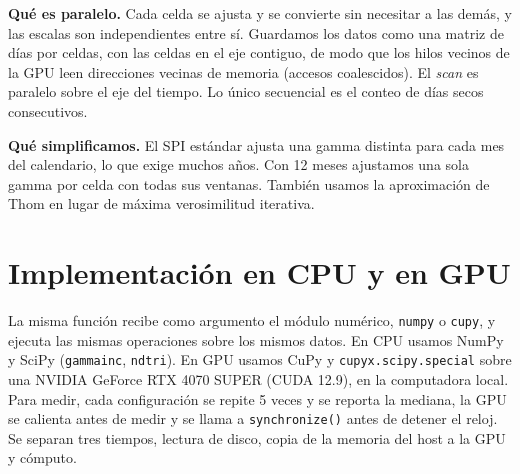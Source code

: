 \documentclass[10pt]{article}
\begin{document}
\textbf{Qu\'e es paralelo.} Cada celda se ajusta y se convierte sin necesitar a las dem\'as, y las escalas son independientes entre s\'i. Guardamos los datos como una matriz de d\'ias por celdas, con las celdas en el eje contiguo, de modo que los hilos vecinos de la GPU leen direcciones vecinas de memoria (accesos coalescidos). El \emph{scan} es paralelo sobre el eje del tiempo. Lo \'unico secuencial es el conteo de d\'ias secos consecutivos.

\textbf{Qu\'e simplificamos.} El SPI est\'andar ajusta una gamma distinta para cada mes del calendario, lo que exige muchos a\~nos. Con 12 meses ajustamos una sola gamma por celda con todas sus ventanas. Tambi\'en usamos la aproximaci\'on de Thom en lugar de m\'axima verosimilitud iterativa.

\section{Implementaci\'on en CPU y en GPU}
La misma funci\'on recibe como argumento el m\'odulo num\'erico, \texttt{numpy} o \texttt{cupy}, y ejecuta las mismas operaciones sobre los mismos datos. En CPU usamos NumPy y SciPy (\texttt{gammainc}, \texttt{ndtri}). En GPU usamos CuPy y \texttt{cupyx.scipy.special} sobre una NVIDIA GeForce RTX 4070 SUPER (CUDA 12.9), en la computadora local. Para medir, cada configuraci\'on se repite 5 veces y se reporta la mediana, la GPU se calienta antes de medir y se llama a \texttt{synchronize()} antes de detener el reloj. Se separan tres tiempos, lectura de disco, copia de la memoria del host a la GPU y c\'omputo.
\end{document}
